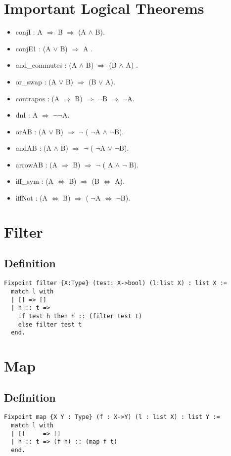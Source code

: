\documentclass[12pt,a4paper]{article}
\theoremstyle{case}
\begin{document}
\section{Important Logical Theorems}
\begin{itemize}
    \item conjI : A $\Rightarrow$ B $\Rightarrow$ (A $\land$ B).
    \item conjE1 : (A $\lor$ B) $\Rightarrow$ A .
    \item and\_commutes : (A $\land$ B) $\Rightarrow$ (B $\land$ A) .
    \item or\_swap : (A $\lor$ B) $\Rightarrow$ (B $\lor$ A).
    \item contrapos : (A $\Rightarrow$ B) $\Rightarrow$ $\neg$B $\Rightarrow$ $\neg$A.
    \item dnI : A $\Rightarrow$ $\neg\neg$A.
    \item orAB :  (A $\lor$ B) $\Rightarrow$ $\neg$ ( $\neg$A $\land$ $\neg$B).
    \item andAB : (A $\land$ B) $\Rightarrow$ $\neg$ ( $\neg$A $\lor$ $\neg$B).
    \item arrowAB : (A $\Rightarrow$ B) $\Rightarrow$ $\neg$ ( A $\land$ $\neg$ B).
    \item iff\_sym : (A $\iff$ B) $\Rightarrow$ (B $\iff$ A).
    \item iffNot : (A $\iff$ B) $\Rightarrow$ ( $\neg$A $\iff$ $\neg$B).
\end{itemize}


\section{Filter}
\subsection{Definition}
\begin{verbatim}
Fixpoint filter {X:Type} (test: X->bool) (l:list X) : list X :=
  match l with
  | [] => []
  | h :: t =>
    if test h then h :: (filter test t)
    else filter test t
  end.
\end{verbatim}

\section{Map}
\subsection{Definition}
\begin{verbatim}
Fixpoint map {X Y : Type} (f : X->Y) (l : list X) : list Y :=
  match l with
  | []     => []
  | h :: t => (f h) :: (map f t)
  end.
\end{verbatim}
\end{document}
